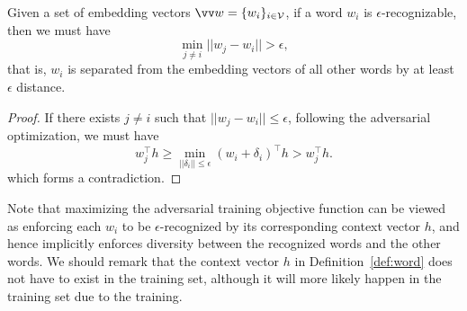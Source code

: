 \documentclass{article}
\begin{document}
\begin{thm}
\label{thm:diversity}
Given a set of embedding vectors $\vv w = \{w_i\}_{i\in \mathcal V}$, 
 if a word $w_i$ is $\epsilon$-recognizable, then we must have 
$$
\min_{j\neq i}||w_j- w_i||  >  \epsilon, $$
that is, 
$w_i$ is separated from the embedding vectors of all other words by at least $\epsilon$ distance. 
\end{thm}
\begin{proof}
If there exists $j\neq i$ such that $||w_j-w_i||\leq \epsilon$, 
following the adversarial optimization, we must have 
$$
w_j^\top h \geq  \min_{||\delta_i||\leq \epsilon} (w_i + \delta_i)^\top h > w_j^\top h.
$$
which forms a contradiction. 
\end{proof}
Note that maximizing the adversarial training objective function 
can be viewed as enforcing each $w_i$ to be $\epsilon$-recognized by 
its corresponding context vector $h$, and hence implicitly enforces diversity between the recognized words and the other words.   
We should remark that the context vector $h$ in Definition~\ref{def:word} does not have to exist in the training set, although it will more likely happen in the training set due to the training. 
 
\end{document}
